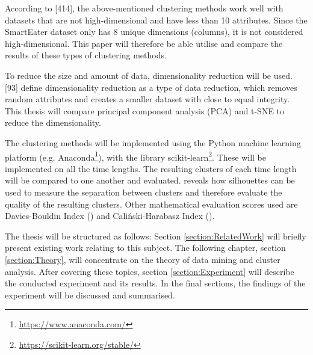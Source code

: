 According to \textcite{han2011data}[414], the above-mentioned clustering methods work well with datasets that are not high-dimensional and have less than 10 attributes. Since the SmartEater dataset only has 8 unique dimensions (columns), it is not considered high-dimensional. This paper will therefore be able utilise and compare the results of these types of clustering methods. 

To reduce the size and amount of data, dimensionality reduction will be used. \textcite{han2011data}[93] define dimensionality reduction as a type of data reduction, which removes random attributes and creates a smaller dataset with close to equal integrity. This thesis will compare principal component analysis (PCA) and t-SNE to reduce the dimensionality.

The clustering methods will be implemented using the Python machine learning platform (e.g. Anaconda\footnote{\url{https://www.anaconda.com/}}), with the library scikit-learn\footnote{\url{https://scikit-learn.org/stable/}}. These will be implemented on all the time lengths. The resulting clusters of each time length will be compared to one another and evaluated. 
\textcite{rousseeuw1987silhouettes} reveals how silhouettes can be used to measure the separation between clusters and therefore evaluate the quality of the resulting clusters. Other mathematical evaluation scores used are Davies-Bouldin Index (\textcite{DaviesBouldin}) and Caliński-Harabasz Index (\textcite{calinskiHarabasz}).

The thesis will be structured as follows: Section \ref{section:RelatedWork} will briefly present existing work relating to this subject. The following chapter, section \ref{section:Theory}, will concentrate on the theory of data mining and cluster analysis. After covering these topics, section \ref{section:Experiment} will describe the conducted experiment and its results. In the final sections, the findings of the experiment will be discussed and summarised. 

